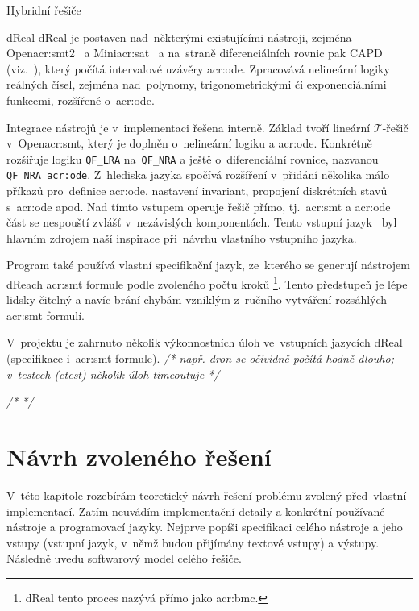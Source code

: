 \documentclass[thesis=M,czech]{FITthesis}[2012/06/26]
\newcommand{\acrlabel}[1]{acr:#1}
\newcommand{\acr}[1]{\acrshort{\acrlabel{#1}}}
\newcommand{\cmt}[1]{\textit{/* #1 */}}
\newcommand{\id}[1]{\texttt{#1}}
\newcommand{\cit}[1]{\cite{#1}}
\newcommand{\set}[1]{\ensuremath{\mathcal{#1}}}
\begin{document}
\begin{section}{Hybridní řešiče}
\begin{paragraph}{dReal}
dReal je postaven nad~některými existujícími nástroji,
zejména Open\acr{smt}2~\cit{opensmt} a Mini\acr{sat}~\cit{minisat}
a na~straně diferenciálních rovnic pak CAPD
(viz.~\cit{dreal-smt-format-art}),
který počítá intervalové uzávěry \acr{ode}.
Zpracovává nelineární logiky
reálných čísel, zejména nad~polynomy,
trigonometrickými či exponenciálními funkcemi,
rozšířené o~\acr{ode}.

Integrace nástrojů je v~implementaci řešena interně.
Základ tvoří lineární \set{T}-řešič v~Open\acr{smt},
který je doplněn o~nelineární logiku a \acr{ode}.
Konkrétně rozšiřuje logiku \id{QF\_\-LRA}
na~\id{QF\_\-NRA} a ještě
o~diferenciální rovnice, nazvanou \id{QF\_\-NRA\_\-\acr{ode}}.
Z~hlediska jazyka spočívá rozšíření v~přidání několika málo příkazů
pro~definice \acr{ode}, nastavení invariant,
propojení diskrétních stavů s~\acr{ode} apod.
Nad tímto vstupem operuje řešič přímo,
tj.~\acr{smt} a \acr{ode} část
se nespouští zvlášť v~nezávislých komponentách.
Tento vstupní jazyk~\cit{dreal-smt-format-art}
byl hlavním zdrojem naší inspirace
při~návrhu vlastního vstupního jazyka.

Program také používá vlastní specifikační jazyk,
ze~kterého se generují nástrojem dReach \acr{smt} formule
podle zvoleného počtu kroků%
\footnote{dReal tento proces
nazývá přímo jako \acr{bmc}.}.
Tento předstupeň je lépe lidsky čitelný
a navíc brání chybám
vzniklým z~ručního vytváření rozsáhlých \acr{smt} formulí.

V~projektu je zahrnuto několik výkonnostních úloh
ve~vstupních jazycích dReal (specifikace i~\acr{smt} formule).
\cmt{např. dron se očividně počítá hodně dlouho;
v~testech (ctest) několik úloh timeoutuje}

\cmt{\cit{dreal-smo-art}}
\end{paragraph} %


\end{section} %



\chapter{Návrh zvoleného řešení}\label{ch:design}
V~této kapitole rozebírám teoretický návrh řešení problému
zvolený před~vlastní implementací.
Zatím neuvádím implementační detaily
a konkrétní používané nástroje a programovací jazyky.
Nejprve popíši specifikaci celého nástroje
a jeho vstupy (vstupní jazyk,
v~němž budou přijímány textové vstupy)
a výstupy.
Následně uvedu softwarový model celého řešiče.
\end{document}
